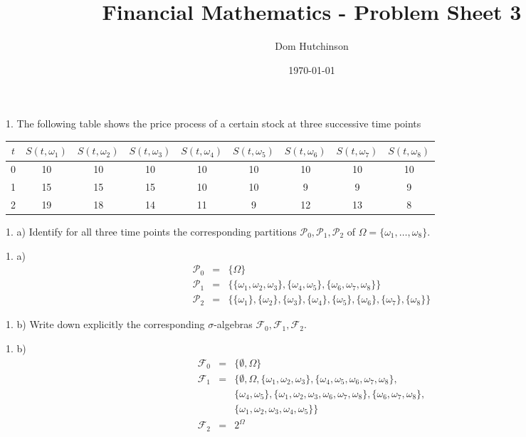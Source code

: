 \documentclass[11pt,a4paper]{article}
\begin{document}
\questionsfalse

\title{Financial Mathematics - Problem Sheet 3}
\author{Dom Hutchinson}
\date{\today}
\maketitle


\begin{question}{1.}
  The following table shows the price process of a certain stock at three successive time points
  \begin{center}
    \begin{tabular}{c|cccccccc}
      $t$&$S(t,\omega_1)$&$S(t,\omega_2)$&$S(t,\omega_3)$&$S(t,\omega_4)$&$S(t,\omega_5)$&$S(t,\omega_6)$&$S(t,\omega_7)$&$S(t,\omega_8)$\\\hline
      0&10&10&10&10&10&10&10&10\\
      1&15&15&15&10&10&9&9&9\\
      2&19&18&14&11&9&12&13&8
    \end{tabular}
  \end{center}
\end{question}

\begin{question}{1. a)}
  Identify for all three time points the corresponding partitions $\mathcal{P}_0,\mathcal{P}_1,\mathcal{P}_2$ of $\Omega=\{\omega_1,\dots,\omega_8\}$.
\end{question}

\begin{answer}{1. a)}
  \[\begin{array}{rcl}
    \mathcal{P}_0&=&\big\{\Omega\big\}\\
    \mathcal{P}_1&=&\big\{\{\omega_1,\omega_2,\omega_3\},\{\omega_4,\omega_5\},\{\omega_6,\omega_7,\omega_8\}\big\}\\
    \mathcal{P}_2&=&\big\{\{\omega_1\},\{\omega_2\},\{\omega_3\},\{\omega_4\},\{\omega_5\},\{\omega_6\},\{\omega_7\},\{\omega_8\}\big\}
  \end{array}\]
\end{answer}

\begin{question}{1. b)}
  Write down explicitly the corresponding $\sigma$-algebras $\mathcal{F}_0,\mathcal{F}_1,\mathcal{F}_2$.
\end{question}

\begin{answer}{1. b)}
  \[\begin{array}{rcl}
    \mathcal{F}_0&=&\big\{\emptyset,\Omega\big\}\\
    \mathcal{F}_1&=&\big\{\emptyset,\Omega,\{\omega_1,\omega_2,\omega_3\},\{\omega_4,\omega_5,\omega_6,\omega_7,\omega_8\},\\
    &&\{\omega_4,\omega_5\},\{\omega_1,\omega_2,\omega_3,\omega_6,\omega_7,\omega_8\},\{\omega_6,\omega_7,\omega_8\},\\
    &&\{\omega_1,\omega_2,\omega_3,\omega_4,\omega_5\}\big\}\\
    \mathcal{F}_2&=&2^\Omega
  \end{array}\]
\end{answer}
\end{document}
